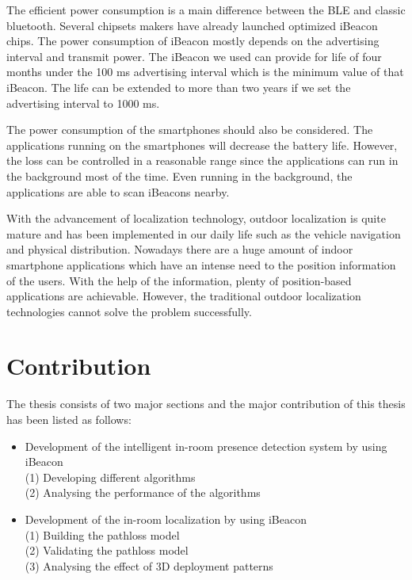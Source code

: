 \documentclass[12pt]{report}
\begin{document}
The efficient power consumption is a main difference between the BLE and classic bluetooth. Several chipsets makers have already launched optimized iBeacon chips. The power consumption of iBeacon mostly depends on the advertising interval and transmit power. The iBeacon we used can provide for life of four months under the 100 ms advertising interval which is the minimum value of that iBeacon. The life can be extended to more than two years if we set the advertising interval to 1000 ms.

The power consumption of the smartphones should also be considered. The applications running on the smartphones will decrease the battery life. However, the loss can be controlled in a reasonable range since the applications can run in the background most of the time. Even running in the background, the applications are able to scan iBeacons nearby. 

With the advancement of localization technology, outdoor localization is quite mature and has been implemented in our daily life such as the vehicle navigation and physical distribution. Nowadays there are a huge amount of indoor smartphone applications which have an intense need to the position information of the users. With the help of the information, plenty of position-based applications are achievable. However, the traditional outdoor localization technologies cannot solve the problem successfully. 

\section{Contribution}
The thesis consists of two major sections and the major contribution of this thesis has been listed as follows:

\begin{itemize}
\item Development of the intelligent in-room presence detection system by using iBeacon \\
\hspace{10mm} (1) Developing different algorithms \\
\hspace{10mm} (2) Analysing the performance of the algorithms
\end{itemize}

\begin{itemize}
\item Development of the in-room localization by using iBeacon \\
\hspace{10mm} (1) Building the pathloss model \\
\hspace{10mm} (2) Validating the pathloss model \\
\hspace{10mm} (3) Analysing the effect of 3D deployment patterns 
\end{itemize}
\end{document}
